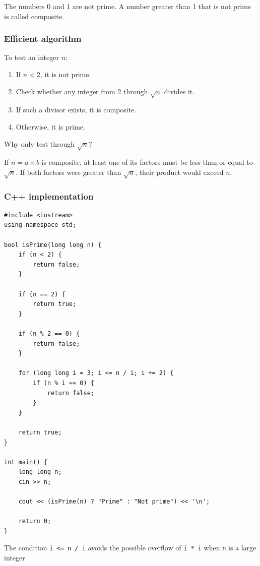 The numbers 0 and 1 are not prime. A number greater than 1 that is not prime is called composite.

\subsubsection{Efficient algorithm}

To test an integer $n$:

\begin{enumerate}
    \item If $n<2$, it is not prime.
    \item Check whether any integer from 2 through $\sqrt n$ divides it.
    \item If such a divisor exists, it is composite.
    \item Otherwise, it is prime.
\end{enumerate}

Why only test through $\sqrt n$?

If $n=a\times b$ is composite, at least one of its factors must be less than or equal to $\sqrt n$. If both factors were greater than $\sqrt n$, their product would exceed $n$.

\subsubsection{C++ implementation}

\begin{lstlisting}[style=cppstyle]
#include <iostream>
using namespace std;

bool isPrime(long long n) {
    if (n < 2) {
        return false;
    }

    if (n == 2) {
        return true;
    }

    if (n % 2 == 0) {
        return false;
    }

    for (long long i = 3; i <= n / i; i += 2) {
        if (n % i == 0) {
            return false;
        }
    }

    return true;
}

int main() {
    long long n;
    cin >> n;

    cout << (isPrime(n) ? "Prime" : "Not prime") << '\n';

    return 0;
}
\end{lstlisting}

The condition \texttt{i <= n / i} avoids the possible overflow of \texttt{i * i} when \texttt{n} is a large integer.


